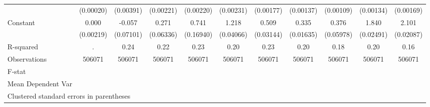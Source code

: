{\begin{tabular}{l*{10}{c}}
                    &   (0.00020)         &   (0.00391)         &   (0.00221)         &   (0.00220)         &   (0.00231)         &   (0.00177)         &   (0.00137)         &   (0.00109)         &   (0.00134)         &   (0.00169)         \\
Constant            &       0.000         &      -0.057         &       0.271\sym{***}&       0.741\sym{***}&       1.218\sym{***}&       0.509\sym{***}&       0.335\sym{***}&       0.376\sym{***}&       1.840\sym{***}&       2.101\sym{***}\\
                    &   (0.00219)         &   (0.07101)         &   (0.06336)         &   (0.16940)         &   (0.04066)         &   (0.03144)         &   (0.01635)         &   (0.05978)         &   (0.02491)         &   (0.02087)         \\
\hline
R-squared           &           .         &        0.24         &        0.22         &        0.23         &        0.20         &        0.23         &        0.20         &        0.18         &        0.20         &        0.16         \\
Observations        &      506071         &      506071         &      506071         &      506071         &      506071         &      506071         &      506071         &      506071         &      506071         &      506071         \\
F-stat              &                     &                     &                     &                     &                     &                     &                     &                     &                     &                     \\
Mean Dependent Var  &                     &                     &                     &                     &                     &                     &                     &                     &                     &                     \\
\hline\hline
\multicolumn{11}{l}{\footnotesize Clustered standard errors in parentheses}\\
\end{tabular}
}
